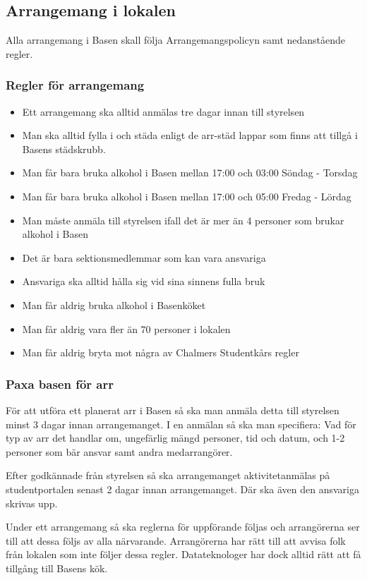 \subsection{Arrangemang i lokalen}
Alla arrangemang i Basen skall följa Arrangemangspolicyn samt nedanstående regler.
\subsubsection{Regler för arrangemang}
\begin{itemize}
    \item Ett arrangemang ska alltid anmälas tre dagar innan till styrelsen
    \item Man ska alltid fylla i och städa enligt de arr-städ lappar som finns att tillgå i Basens städskrubb.
    \item Man får bara bruka alkohol i Basen mellan 17:00 och 03:00 Söndag - Torsdag
    \item Man får bara bruka alkohol i Basen mellan 17:00 och 05:00 Fredag - Lördag
    \item Man måste anmäla till styrelsen ifall det är mer än 4 personer som brukar alkohol i Basen
    \item Det är bara sektionsmedlemmar som kan vara ansvariga
    \item Ansvariga ska alltid hålla sig vid sina sinnens fulla bruk
    \item Man får aldrig bruka alkohol i Basenköket
    \item Man får aldrig vara fler än 70 personer i lokalen
    \item Man får aldrig bryta mot några av Chalmers Studentkårs regler
\end{itemize}
\subsubsection{Paxa basen för arr}
För att utföra ett planerat arr i Basen så ska man anmäla detta till styrelsen minst 3 dagar innan arrangemanget. I en anmälan så ska man specifiera: Vad för typ av arr det handlar om, ungefärlig mängd personer, tid och datum, och 1-2 personer som bär ansvar samt
andra medarrangörer.

Efter godkännade från styrelsen så ska arrangemanget aktivitetanmälas på studentportalen senast 2 dagar innan arrangemanget. Där ska även den ansvariga skrivas upp.

Under ett arrangemang så ska reglerna för uppförande följas och arrangörerna ser till att dessa följs av alla närvarande. Arrangörerna har rätt till att avvisa folk från lokalen som
inte följer dessa regler. Datateknologer har dock alltid rätt att få tillgång till Basens kök.


